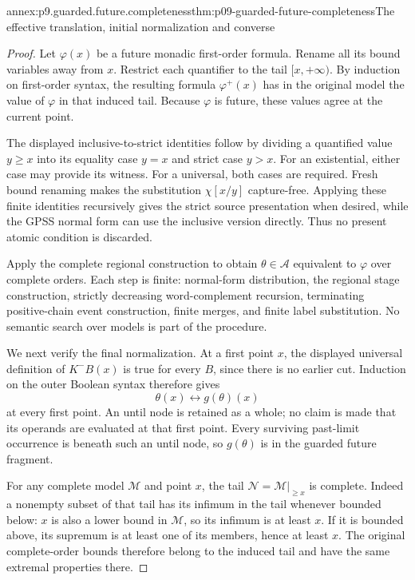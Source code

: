 \begin{annexitem}{annex:p9.guarded.future.completeness}{thm:p09-guarded-future-completeness}{The effective translation, initial normalization and converse}
\begin{proof}
Let \(\varphi(x)\) be
a future monadic
first-order formula.
Rename all its bound
variables away from
\(x\). Restrict
each quantifier to
the tail \([x,+\infty)\).
By induction on
first-order syntax,
the resulting formula
\(\varphi^+(x)\)
has in the original
model the value of
\(\varphi\) in that
induced tail.
Because \(\varphi\)
is future, these
values agree at
the current point.

The displayed
inclusive-to-strict
identities follow
by dividing a
quantified value
\(y\geq x\)
into its equality
case \(y=x\)
and strict case
\(y>x\).
For an existential,
either case may
provide its
witness. For
a universal,
both cases
are required.
Fresh bound
renaming makes
the substitution
\(\chi[x/y]\)
capture-free.
Applying these
finite identities
recursively gives
the strict source
presentation when
desired, while
the GPSS normal
form can use
the inclusive
version directly.
Thus no present
atomic condition
is discarded.

Apply the complete
regional construction
to obtain
\(\theta\in\mathcal A\)
equivalent to
\(\varphi\)
over complete
orders. Each
step is finite:
normal-form
distribution,
the regional
stage construction,
strictly decreasing
word-complement
recursion, terminating
positive-chain
event construction,
finite merges,
and finite
label substitution.
No semantic
search over
models is
part of the
procedure.

We next verify
the final
normalization.
At a first
point \(x\),
the displayed
universal
definition of
\(K^-B(x)\)
is true for
every \(B\),
since there
is no earlier
cut. Induction
on the outer
Boolean syntax
therefore gives
\[
                  \theta(x)\longleftrightarrow g(\theta)(x)
\]
at every first
point. An
until node
is retained
as a whole;
no claim
is made that
its operands
are evaluated
at that first
point. Every
surviving
past-limit
occurrence
is beneath
such an
until node,
so \(g(\theta)\)
is in the
guarded future
fragment.

For any
complete model
\(\mathcal M\)
and point
\(x\), the
tail
\(\mathcal N=\mathcal M|_{\geq x}\)
is complete.
Indeed a
nonempty subset
of that tail
has its
infimum in
the tail
whenever
bounded below:
\(x\) is
also a lower
bound in
\(\mathcal M\),
so its
infimum is
at least
\(x\).
If it is
bounded above,
its supremum
is at least
one of its
members, hence
at least \(x\).
The original
complete-order
bounds therefore
belong to
the induced
tail and have
the same
extremal
properties
there.


\end{proof}
\end{annexitem}
